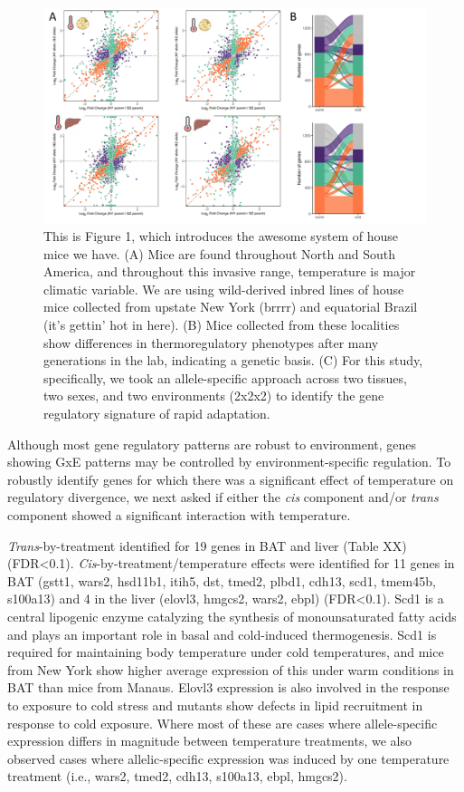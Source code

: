 \documentclass[9pt,twocolumn,twoside,lineno]{pnas-new}
\begin{document}
\begin{figure}[t]
  \includegraphics[width=\textwidth]{./figure_3.pdf}
  \caption{This is Figure 1, which introduces the awesome system of house mice we have. (A) Mice are found throughout North and South America, and throughout this invasive range, temperature is major climatic variable. We are using wild-derived inbred lines of house mice collected from upstate New York (brrrr) and equatorial Brazil (it's gettin' hot in here). (B) Mice collected from these localities show differences in thermoregulatory phenotypes after many generations in the lab, indicating a genetic basis. (C) For this study, specifically, we took an allele-specific approach across two tissues, two sexes, and two environments (2x2x2) to identify the gene regulatory signature of rapid adaptation.}
\end{figure}

Although most gene regulatory patterns are robust to environment, genes
showing GxE patterns may be controlled by environment-specific
regulation. To robustly identify genes for which there was a significant
effect of temperature on regulatory divergence, we next asked if either
the \emph{cis} component and/or \emph{trans} component showed a
significant interaction with temperature.

\emph{Trans}-by-treatment identified for 19 genes in BAT and liver
(Table XX)(FDR\textless0.1). \emph{Cis}-by-treatment/temperature effects
were identified for 11 genes in BAT (gstt1, wars2, hsd11b1, itih5, dst,
tmed2, plbd1, cdh13, scd1, tmem45b, s100a13) and 4 in the liver (elovl3,
hmgcs2, wars2, ebpl) (FDR\textless0.1). Scd1 is a central lipogenic
enzyme catalyzing the synthesis of monounsaturated fatty acids and plays
an important role in basal and cold-induced thermogenesis. Scd1 is
required for maintaining body temperature under cold temperatures, and
mice from New York show higher average expression of this under warm
conditions in BAT than mice from Manaus. Elovl3 expression is also
involved in the response to exposure to cold stress and mutants show
defects in lipid recruitment in response to cold exposure. Where most of
these are cases where allele-specific expression differs in magnitude
between temperature treatments, we also observed cases where
allelic-specific expression was induced by one temperature treatment
(i.e., wars2, tmed2, cdh13, s100a13, ebpl, hmgcs2).
\end{document}
